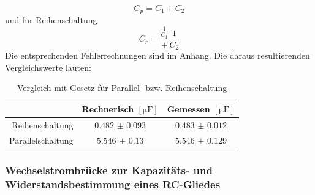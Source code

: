 \begin{equation*}
	C_p = C_1 + C_2
\end{equation*}
und für Reihenschaltung
\begin{equation*}
	C_r = \frac{\frac{1}{C_1}}+{\frac{1}{C_2}}
\end{equation*}
Die entsprechenden Fehlerrechnungen sind im Anhang. Die daraus resultierenden Vergleichswerte lauten:
\begin{table}[H]
	\centering
	\begin{tabular}{r|cc}
		 & Rechnerisch $ [\si{\micro\farad}] $ & Gemessen $ [\si{\micro\farad}] $ \\\hline
		 Reihenschaltung & $ \num{0.482(0093)} $ & $ \num{0.483(0012)} $ \\
		 Parallelschaltung & $ \num{5.546(0130)} $ & $ \num{5.546(0129)} $
	\end{tabular}
	\caption{Vergleich mit Gesetz für Parallel- bzw. Reihenschaltung}
\end{table}

\subsubsection{Wechselstrombrücke zur Kapazitäts- und Widerstandsbestimmung eines RC-Gliedes}

